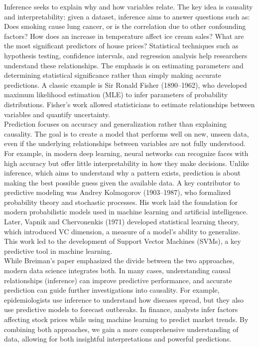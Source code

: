 \documentclass{book}
\begin{document}
Inference seeks to explain why and how variables relate. The key idea is causality and interpretability: given a dataset, inference aims to answer questions such as: Does smoking cause lung cancer, or is the correlation due to other confounding factors? How does an increase in temperature affect ice cream sales? What are the most significant predictors of house prices? Statistical techniques such as hypothesis testing, confidence intervals, and regression analysis help researchers understand these relationships. The emphasis is on estimating parameters and determining statistical significance rather than simply making accurate predictions. A classic example is Sir Ronald Fisher (1890–1962), who developed maximum likelihood estimation (MLE) to infer parameters of probability distributions. Fisher’s work allowed statisticians to estimate relationships between variables and quantify uncertainty.\\

Prediction focuses on accuracy and generalization rather than explaining causality. The goal is to create a model that performs well on new, unseen data, even if the underlying relationships between variables are not fully understood. For example, in modern deep learning, neural networks can recognize faces with high accuracy but offer little interpretability in how they make decisions. Unlike inference, which aims to understand why a pattern exists, prediction is about making the best possible guess given the available data. A key contributor to predictive modeling was Andrey Kolmogorov (1903–1987), who formalized probability theory and stochastic processes. His work laid the foundation for modern probabilistic models used in machine learning and artificial intelligence. Later, Vapnik and Chervonenkis (1971) developed statistical learning theory, which introduced VC dimension, a measure of a model’s ability to generalize. This work led to the development of Support Vector Machines (SVMs), a key predictive tool in machine learning.\\

While Breiman’s paper emphasized the divide between the two approaches, modern data science integrates both. In many cases, understanding causal relationships (inference) can improve predictive performance, and accurate prediction can guide further investigations into causality. For example, epidemiologists use inference to understand how diseases spread, but they also use predictive models to forecast outbreaks. In finance, analysts infer factors affecting stock prices while using machine learning to predict market trends. By combining both approaches, we gain a more comprehensive understanding of data, allowing for both insightful interpretations and powerful predictions.
\end{document}

